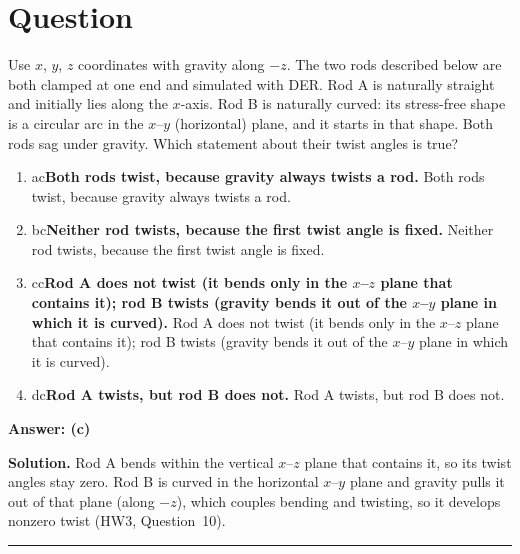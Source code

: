 \documentclass[letterpaper,11pt]{article}
\newcounter{qnum}
\newcommand{\opt}[3]{\item \if#1#2{\boldmath\textbf{#3}} \quad \textcolor{OliveGreen}{\checkmark}\else #3\fi}
\newcommand{\sol}[7]{%
  \stepcounter{qnum}%
  \section*{Question \theqnum}
  #1
  \begin{enumerate}[label=(\alph*)]
    \opt{a}{#6}{#2}
    \opt{b}{#6}{#3}
    \opt{c}{#6}{#4}
    \opt{d}{#6}{#5}
  \end{enumerate}
  \vspace{1mm}
  \textbf{Answer: (#6)}

  \textbf{Solution.} #7

  \vspace{2mm}\hrule
}
\begin{document}
%
%
\sol{Use $x$, $y$, $z$ coordinates with gravity along $-z$. The two rods described below are both clamped at one end and simulated with DER. Rod A is naturally straight and initially lies along the $x$-axis. Rod B is naturally curved: its stress-free shape is a circular arc in the $x$--$y$ (horizontal) plane, and it starts in that shape. Both rods sag under gravity. Which statement about their twist angles is true?}
  {Both rods twist, because gravity always twists a rod.}
  {Neither rod twists, because the first twist angle is fixed.}
  {Rod A does not twist (it bends only in the $x$--$z$ plane that contains it); rod B twists (gravity bends it out of the $x$--$y$ plane in which it is curved).}
  {Rod A twists, but rod B does not.}
  {c}
  {Rod A bends within the vertical $x$--$z$ plane that contains it, so its twist angles stay zero. Rod B is curved in the horizontal $x$--$y$ plane and gravity pulls it out of that plane (along $-z$), which couples bending and twisting, so it develops nonzero twist (HW3, Question~10).}
\end{document}
